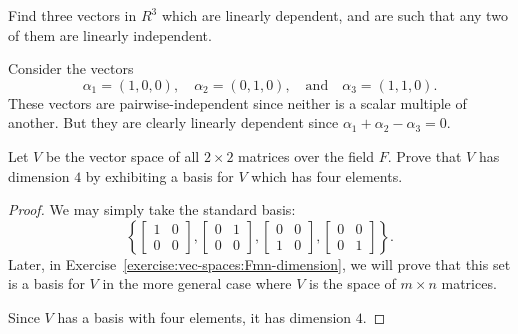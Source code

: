 Find three vectors in $R^3$ which are linearly dependent,
and are such that any two of them are linearly independent.
\begin{solution}
  Consider the vectors
  \begin{equation*}
    \alpha_1 = (1, 0, 0), \quad
    \alpha_2 = (0, 1, 0), \quad\text{and}\quad
    \alpha_3 = (1, 1, 0).
  \end{equation*}
  These vectors are pairwise-independent since neither is a scalar
  multiple of another. But they are clearly linearly dependent since
  $\alpha_1 + \alpha_2 - \alpha_3 = 0$.
\end{solution}

\label{exercise:vec-spaces:F2x2-basis}
Let $V$ be the vector space of all $2\times2$ matrices over the field
$F$. Prove that $V$ has dimension $4$ by exhibiting a basis for $V$
which has four elements.
\begin{proof}
  We may simply take the standard basis:
  \begin{equation*}
    \left\{
      \begin{bmatrix}
        1 & 0 \\ 0 & 0
      \end{bmatrix},
      \begin{bmatrix}
        0 & 1 \\ 0 & 0
      \end{bmatrix},
      \begin{bmatrix}
        0 & 0 \\ 1 & 0
      \end{bmatrix},
      \begin{bmatrix}
        0 & 0 \\ 0 & 1
      \end{bmatrix}
    \right\}.
  \end{equation*}
  Later, in Exercise~\ref{exercise:vec-spaces:Fmn-dimension}, we will
  prove that this set is a basis for $V$ in the more general case
  where $V$ is the space of $m\times n$ matrices.

  Since $V$ has a basis with four elements, it has dimension $4$.
\end{proof}


